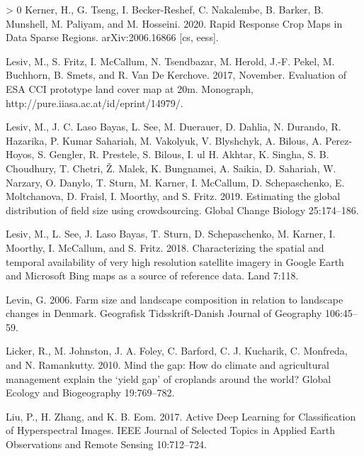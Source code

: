 \documentclass[11pt,a4paper]{article}
\newlength{\cslhangindent}
\newenvironment{CSLReferences}[3] %
 {%
  \setlength{\parindent}{0pt}
  \ifodd #1 \everypar{\setlength{\hangindent}{\cslhangindent}}\ignorespaces\fi
  \ifnum #2 > 0
  \setlength{\parskip}{#2\baselineskip}
  \fi
 }%
 {}
\begin{document}
\begin{CSLReferences}{1}{0}
\leavevmode\hypertarget{ref-kernerRapidResponseCrop2020}{}%
Kerner, H., G. Tseng, I. Becker-Reshef, C. Nakalembe, B. Barker, B.
Munshell, M. Paliyam, and M. Hosseini. 2020. Rapid {Response Crop Maps}
in {Data Sparse Regions}. arXiv:2006.16866 {[}cs, eess{]}.

\leavevmode\hypertarget{ref-LesivEvaluationESACCI2017}{}%
Lesiv, M., S. Fritz, I. McCallum, N. Tsendbazar, M. Herold, J.-F. Pekel,
M. Buchhorn, B. Smets, and R. Van De Kerchove. 2017, November.
Evaluation of {ESA CCI} prototype land cover map at 20m. Monograph,
http://pure.iiasa.ac.at/id/eprint/14979/.

\leavevmode\hypertarget{ref-lesivEstimatingGlobalDistribution2019}{}%
Lesiv, M., J. C. Laso Bayas, L. See, M. Duerauer, D. Dahlia, N. Durando,
R. Hazarika, P. Kumar Sahariah, M. Vakolyuk, V. Blyshchyk, A. Bilous, A.
Perez-Hoyos, S. Gengler, R. Prestele, S. Bilous, I. ul H. Akhtar, K.
Singha, S. B. Choudhury, T. Chetri, Ž. Malek, K. Bungnamei, A. Saikia,
D. Sahariah, W. Narzary, O. Danylo, T. Sturn, M. Karner, I. McCallum, D.
Schepaschenko, E. Moltchanova, D. Fraisl, I. Moorthy, and S. Fritz.
2019. Estimating the global distribution of field size using
crowdsourcing. Global Change Biology 25:174--186.

\leavevmode\hypertarget{ref-LesivCharacterizingspatialtemporal2018}{}%
Lesiv, M., L. See, J. Laso Bayas, T. Sturn, D. Schepaschenko, M. Karner,
I. Moorthy, I. McCallum, and S. Fritz. 2018. Characterizing the spatial
and temporal availability of very high resolution satellite imagery in
{Google Earth} and {Microsoft Bing} maps as a source of reference data.
Land 7:118.

\leavevmode\hypertarget{ref-levinFarmSizeLandscape2006}{}%
Levin, G. 2006. Farm size and landscape composition in relation to
landscape changes in {Denmark}. Geografisk Tidsskrift-Danish Journal of
Geography 106:45--59.

\leavevmode\hypertarget{ref-LickerMindgaphow2010}{}%
Licker, R., M. Johnston, J. A. Foley, C. Barford, C. J. Kucharik, C.
Monfreda, and N. Ramankutty. 2010. Mind the gap: How do climate and
agricultural management explain the {`yield gap'} of croplands around
the world? Global Ecology and Biogeography 19:769--782.

\leavevmode\hypertarget{ref-liuActiveDeepLearning2017}{}%
Liu, P., H. Zhang, and K. B. Eom. 2017. Active {Deep Learning} for
{Classification} of {Hyperspectral Images}. IEEE Journal of Selected
Topics in Applied Earth Observations and Remote Sensing 10:712--724.


\end{CSLReferences}
\end{document}
